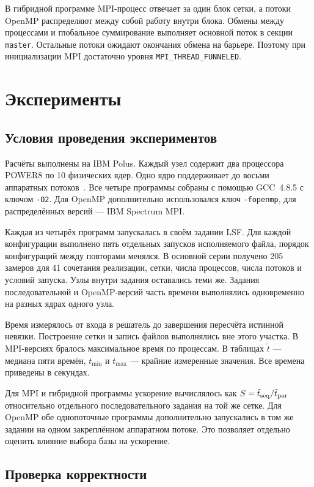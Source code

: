 \documentclass[a4paper,12pt]{extarticle}
\begin{document}
В гибридной программе MPI-процесс отвечает за один блок сетки, а потоки OpenMP распределяют между собой работу внутри блока. Обмены между процессами и глобальное суммирование выполняет основной поток в секции \texttt{master}. Остальные потоки ожидают окончания обмена на барьере. Поэтому при инициализации MPI достаточно уровня \texttt{MPI\_THREAD\_FUNNELED}.

\section{Эксперименты}

\subsection{Условия проведения экспериментов}

Расчёты выполнены на IBM Polus. Каждый узел содержит два процессора POWER8 по 10 физических ядер. Одно ядро поддерживает до восьми аппаратных потоков~\cite{polus}. Все четыре программы собраны с помощью GCC~4.8.5 с ключом \texttt{-O2}. Для OpenMP дополнительно использовался ключ \texttt{-fopenmp}, для распределённых версий --- IBM Spectrum MPI.

Каждая из четырёх программ запускалась в своём задании LSF. Для каждой конфигурации выполнено пять отдельных запусков исполняемого файла, порядок конфигураций между повторами менялся. В основной серии получено 205 замеров для 41 сочетания реализации, сетки, числа процессов, числа потоков и условий запуска. Узлы внутри задания оставались теми же. Задания последовательной и OpenMP-версий часть времени выполнялись одновременно на разных ядрах одного узла.

Время измерялось от входа в решатель до завершения пересчёта истинной невязки. Построение сетки и запись файлов выполнялись вне этого участка. В MPI-версиях бралось максимальное время по процессам. В таблицах $\tilde t$ --- медиана пяти времён, $t_{\min}$ и $t_{\max}$ --- крайние измеренные значения. Все времена приведены в секундах.

Для MPI и гибридной программы ускорение вычислялось как $S=\tilde t_{\rm seq}/\tilde t_{\rm par}$ относительно отдельного последовательного задания на той же сетке. Для OpenMP обе однопоточные программы дополнительно запускались в том же задании на одном закреплённом аппаратном потоке. Это позволяет отдельно оценить влияние выбора базы на ускорение.

\subsection{Проверка корректности}
\end{document}
